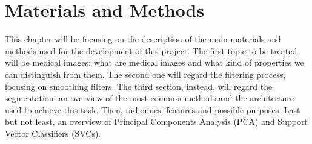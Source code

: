 \documentclass{standalone}
\begin{document}
\chapter{Materials and Methods}

This chapter will be focusing on the description of the main materials and methods used for the development of this project.
The first topic to be treated will be medical images: what are medical images and what kind of properties we can distinguish from them.
The second one will regard the filtering process, focusing on smoothing filters.
The third section, instead, will regard the segmentation: an overview of the most common methods and the architecture used to achieve this task.
Then, radiomics: features and possible purposes.
Last but not least, an overview of Principal Components Analysis (PCA) and Support Vector Classifiers (SVCs).
\end{document}
